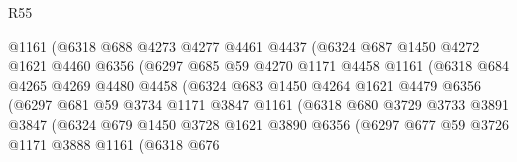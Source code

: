 \begin{lexlean}{R55}
\begin{coremodule}
                          @1161
                          (@6318
                            @688
                            @4273
                            @4277
                            @4461
                            @4437
                            (@6324
                              @687
                              @1450
                              @4272
                              @1621
                              @4460
                              @6356
                              (@6297
                                @685
                                @59
                                @4270
                                @1171
                                @4458
                                @1161
                                (@6318
                                  @684
                                  @4265
                                  @4269
                                  @4480
                                  @4458
                                  (@6324
                                    @683
                                    @1450
                                    @4264
                                    @1621
                                    @4479
                                    @6356
                                    (@6297
                                      @681
                                      @59
                                      @3734
                                      @1171
                                      @3847
                                      @1161
                                      (@6318
                                        @680
                                        @3729
                                        @3733
                                        @3891
                                        @3847
                                        (@6324
                                          @679
                                          @1450
                                          @3728
                                          @1621
                                          @3890
                                          @6356
                                          (@6297
                                            @677
                                            @59
                                            @3726
                                            @1171
                                            @3888
                                            @1161
                                            (@6318
                                              @676

\end{coremodule}
\end{lexlean}
